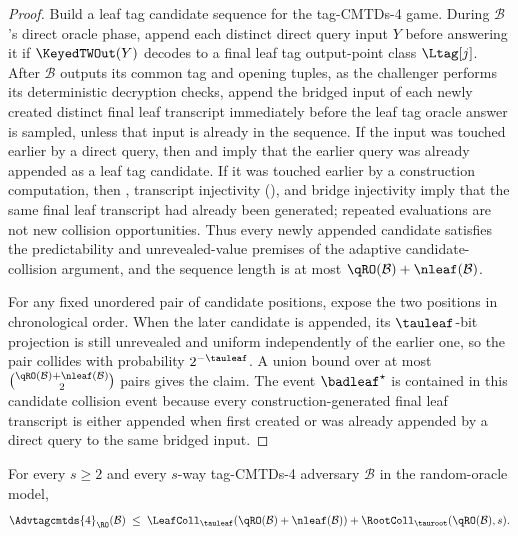 \begin{proof}
Build a leaf tag candidate sequence for the tag-CMTDs-4 game. During
$\mathcal{B}$'s direct oracle phase, append each distinct direct query
input $Y$ before answering it if $\KeyedTWOut(Y)$ decodes to a final
leaf tag output-point class $\Ltag[j]$. After $\mathcal{B}$ outputs its
common tag and opening tuples, as the challenger performs its
deterministic decryption checks, append the bridged input of each newly
created distinct final leaf transcript immediately before the leaf tag
oracle answer is sampled, unless that input is already in the sequence.
If the input was touched earlier by a direct query, then
 and  imply that the
earlier query was already appended as a leaf tag candidate. If it was
touched earlier by a construction computation, then
, transcript injectivity
(), and bridge injectivity imply that the same
final leaf transcript had already been generated; repeated evaluations
are not new collision opportunities. Thus every newly appended
candidate satisfies the predictability and unrevealed-value premises of
the adaptive candidate-collision argument, and the sequence length is at
most $\qRO(\mathcal{B})+\nleaf(\mathcal{B})$.

For any fixed unordered pair of candidate positions, expose the two
positions in chronological order. When the later candidate is appended,
its $\tauleaf$-bit projection is still unrevealed and uniform
independently of the earlier one, so the pair collides with probability
$2^{-\tauleaf}$. A union bound over at most
$\binom{\qRO(\mathcal{B})+\nleaf(\mathcal{B})}{2}$ pairs gives the
claim. The event $\badleaf^\star$ is contained in this candidate
collision event because every construction-generated final leaf
transcript is either appended when first created or was already appended
by a direct query to the same bridged input.
\end{proof}

\begin{theorem}
\label{thm:tag-cmtds4-ro}
For every $s \geq 2$ and every $s$-way tag-CMTDs-4
adversary $\mathcal{B}$ in the \TW{} random-oracle model,
\[
  \Advtagcmtds{4}_{\RO}(\mathcal{B})
  \;\leq\;
  \LeafColl_{\tauleaf}(\qRO(\mathcal{B})+\nleaf(\mathcal{B}))
  + \RootColl_{\tauroot}(\qRO(\mathcal{B}), s).
\]
\end{theorem}

